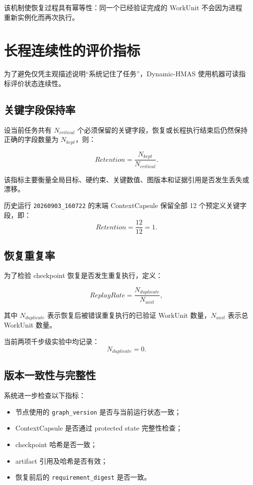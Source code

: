 \documentclass[UTF8,a4paper,12pt,oneside]{ctexbook}
\begin{document}
该机制使恢复过程具有幂等性：同一个已经验证完成的 WorkUnit 不会因为进程重新实例化而再次执行。


\section{长程连续性的评价指标}

为了避免仅凭主观描述说明“系统记住了任务”，Dynamic-HMAS 使用机器可读指标评价状态连续性。

\subsection{关键字段保持率}

设当前任务共有 $N_{critical}$ 个必须保留的关键字段，恢复或长程执行结束后仍然保持正确的字段数量为 $N_{kept}$，则：

\[
Retention
=
\frac{N_{kept}}{N_{critical}}.
\]

该指标主要衡量全局目标、硬约束、关键数值、图版本和证据引用是否发生丢失或漂移。

历史运行 \texttt{20260903\_160722} 的末端 ContextCapsule 保留全部 12 个预定义关键字段，即：
\[
Retention=\frac{12}{12}=1.
\]

\subsection{恢复重复率}

为了检验 checkpoint 恢复是否发生重复执行，定义：

\[
ReplayRate
=
\frac{N_{duplicate}}{N_{unit}},
\]

其中 $N_{duplicate}$ 表示恢复后被错误重复执行的已验证 WorkUnit 数量，$N_{unit}$ 表示总 WorkUnit 数量。

当前两项千步级实验中均记录：
\[
N_{duplicate}=0.
\]

\subsection{版本一致性与完整性}

系统进一步检查以下指标：

\begin{itemize}
    \item 节点使用的 \texttt{graph\_version} 是否与当前运行状态一致；
    \item ContextCapsule 是否通过 protected state 完整性检查；
    \item checkpoint 哈希是否一致；
    \item artifact 引用及哈希是否有效；
    \item 恢复前后的 \texttt{requirement\_digest} 是否一致。
\end{itemize}
\end{document}
